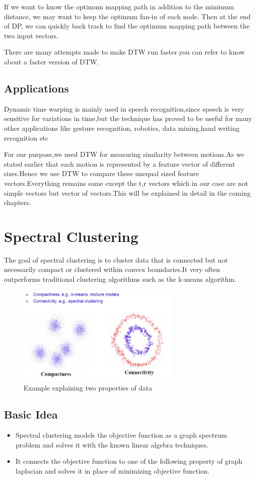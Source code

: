 If we want to know the optimum mapping path in addition to the minimum distance, we may want to keep the optimum fan-in of each node. Then at the end of DP, we can quickly back track to find the optimum mapping path between the two input vectors. 

There are many attempts made to make DTW run faster.you can refer \cite{DTW} to know about a faster version of DTW.

\subsection{Applications}
Dynamic time warping is mainly used in speech recognition,since speech is very sensitive for variations in time,but the technique has proved to be useful for many other applications like gesture recognition, robotics, data mining,hand writing recognition etc


For our purpose,we used DTW for measuring similarity between motions.As we stated earlier that each motion is represented by a feature vector of different sizes.Hence we use DTW to compare these unequal sized feature vectors.Everything remains same except the t,r vectors which in our case are not simple vectors but vector of vectors.This will be explained in detail in the coming chapters.

\section{Spectral Clustering}
The goal of spectral clustering is to cluster data that is connected but not necessarily compact or clustered within convex boundaries.It very often outperforms traditional clustering algorithms such as the k-means algorithm.

\begin{figure} [!htbp]
\centering
\includegraphics[width=80mm]{Pictures/spec.png}
\caption{Example explaining two properties of data}
\end{figure}

\subsection{Basic Idea}
\begin{itemize}
    \item Spectral clustering models the objective function as a graph spectrum problem and solves it with the known linear algebra techniques.
    \item It connects the objective function to one of the following  property of graph laplacian and solves it in place of minimizing objective function.
\end{itemize}

